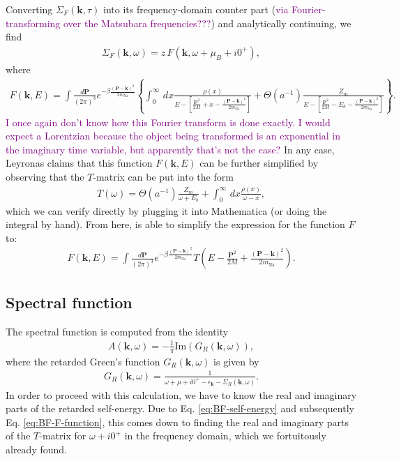 \documentclass{article}
\theoremstyle{definition}
\newcommand{\f}[2]{\frac{#1}{#2}}
\begin{document}
\noindent Converting $\Sigma_F(\mathbf{k}, \tau)$ into its frequency-domain counter part (\textcolor{purple}{via Fourier-transforming over the Matsubara frequencies???}) and analytically continuing, we find 
\begin{align}\label{eq:BF-self-energy}
\Sigma_F(\mathbf{k}, \omega) =  z \, F(\mathbf{k}, \omega + \mu_B + i0^+),
\end{align}
where
\begin{align}
F(\mathbf{k}, E) = \int \frac{d\mathbf{P}}{(2\pi)^3} e^{-\beta  \frac{(\mathbf{P}- \mathbf{k})^2}{2m_\text{Na}}}
\left\{
\int_0^\infty \,dx \frac{\rho(x)}{E - \left[ \frac{\mathbf{P}^2}{2M} + x - \frac{(\mathbf{P} - \mathbf{k})^2}{2m_\text{Na}} \right]}
+
\Theta(a^{-1})\frac{Z_m}{E - \left[ \frac{\mathbf{P}^2}{2M} - E_b - \frac{(\mathbf{P} - \mathbf{k})^2}{2m_\text{Na}}\right]}
\right\}.
\end{align}
\textcolor{purple}{I once again don't know how this Fourier transform is done exactly. I would expect a Lorentzian because the object being transformed is an exponential in the imaginary time variable, but apparently that's not the case?} In any case, Leyronas claims that this function $F(\mathbf{k}, E)$ can be further simplified by observing that the $T$-matrix can be put into the form
\begin{align}
T(\omega) = \Theta(a^{-1}) \frac{Z_m}{\omega + E_b} + \int_0^\infty \,dx \frac{\rho(x)}{\omega - x},
\end{align}
which we can verify directly by plugging it into Mathematica (or doing the integral by hand). From here, \cite{sun2015high} is able to simplify the expression for the function $F$ to:
\begin{align}\label{eq:BF-F-function}
F(\mathbf{k}, E) = \int \frac{d\mathbf{P}}{(2\pi)^3} e^{-\beta \frac{(\mathbf{P} - \mathbf{k})^2}{2m_\text{Na}}} T\left( E - \frac{\mathbf{P}^2}{2M} + \frac{(\mathbf{P} - \mathbf{k})^2}{2m_\text{Na}} \right).
\end{align}


\subsection{Spectral function}

The spectral function is computed from the identity
\begin{align}
A(\mathbf{k}, \omega) = -\f{1}{\pi}\text{Im}(G_R(\mathbf{k}, \omega)),
\end{align}
where the retarded Green's function $G_R(\mathbf{k}, \omega)$ is given by 
\begin{align}
G_R(\mathbf{k}, \omega) = \f{1}{\omega + \mu + i0^+ - \epsilon_\mathbf{k} - \Sigma_R(\mathbf{k}, \omega)}.
\end{align}
In order to proceed with this calculation, we have to know the real and imaginary parts of the retarded self-energy. Due to  Eq. \eqref{eq:BF-self-energy} and subsequently Eq. \eqref{eq:BF-F-function}, this comes down to finding the real and imaginary parts of the $T$-matrix for $\omega + i0^+$ in the frequency domain, which we fortuitously already found.\\
\end{document}
